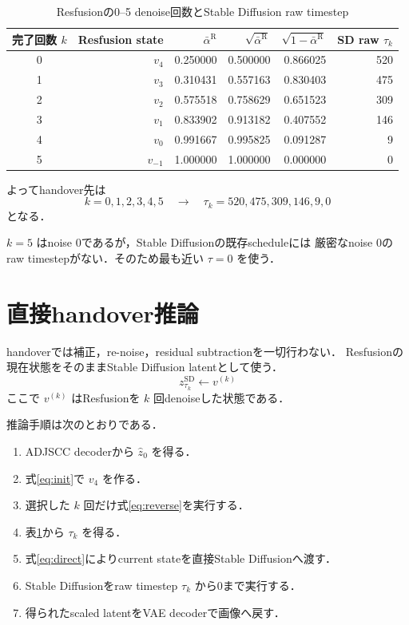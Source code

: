 \documentclass[11pt,a4paper]{ltjsarticle}
\begin{document}
\begin{table}[htbp]
  \centering
  \small
  \caption{Resfusionの0--5 denoise回数とStable Diffusion raw timestep}
  \label{tab:mapping}
  \begin{tabular}{crrrrr}
    \toprule
    完了回数 \(k\) &
    Resfusion state &
    \(\bar\alpha^{\mathrm R}\) &
    \(\sqrt{\bar\alpha^{\mathrm R}}\) &
    \(\sqrt{1-\bar\alpha^{\mathrm R}}\) &
    SD raw \(\tau_k\) \\
    \midrule
    0 & \(v_4\)    & 0.250000 & 0.500000 & 0.866025 & 520 \\
    1 & \(v_3\)    & 0.310431 & 0.557163 & 0.830403 & 475 \\
    2 & \(v_2\)    & 0.575518 & 0.758629 & 0.651523 & 309 \\
    3 & \(v_1\)    & 0.833902 & 0.913182 & 0.407552 & 146 \\
    4 & \(v_0\)    & 0.991667 & 0.995825 & 0.091287 & 9 \\
    5 & \(v_{-1}\) & 1.000000 & 1.000000 & 0.000000 & 0 \\
    \bottomrule
  \end{tabular}
\end{table}

よってhandover先は
\[
\boxed{
  k=0,1,2,3,4,5
  \quad\longrightarrow\quad
  \tau_k=520,475,309,146,9,0
}
\]
となる．

\(k=5\) はnoise 0であるが，Stable Diffusionの既存scheduleには
厳密なnoise 0のraw timestepがない．そのため最も近い \(\tau=0\) を使う．

\section{直接handover推論}

handoverでは補正，re-noise，residual subtractionを一切行わない．
Resfusionの現在状態をそのままStable Diffusion latentとして使う．
\begin{equation}
\boxed{
  z^{\mathrm{SD}}_{\tau_k}
  \leftarrow
  v^{(k)}
}
\label{eq:direct}
\end{equation}
ここで \(v^{(k)}\) はResfusionを \(k\) 回denoiseした状態である．

推論手順は次のとおりである．
\begin{enumerate}
  \item ADJSCC decoderから \(\hat z_0\) を得る．
  \item 式\eqref{eq:init}で \(v_4\) を作る．
  \item 選択した \(k\) 回だけ式\eqref{eq:reverse}を実行する．
  \item 表\ref{tab:mapping}から \(\tau_k\) を得る．
  \item 式\eqref{eq:direct}によりcurrent stateを直接Stable Diffusionへ渡す．
  \item Stable Diffusionをraw timestep \(\tau_k\) から0まで実行する．
  \item 得られたscaled latentをVAE decoderで画像へ戻す．
\end{enumerate}
\end{document}
